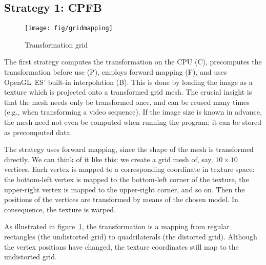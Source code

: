 \documentclass[english,12pt]{ifimaster}
\begin{document}
\subsection{Strategy 1: CPFB}

\begin{figure}[b]
  \centering
  \texttt{[image: fig/gridmapping]}
  \caption{Transformation grid}
  \label{fig:gridmapping}
\end{figure}

The first strategy computes the transformation on the CPU (C),
precomputes the transformation before use (P), employs forward mapping
(F), and uses OpenGL~ES' built-in interpolation (B). This is done by
loading the image as a texture which is projected onto a transformed
grid mesh. The crucial insight is that the mesh needs only be
transformed once, and can be reused many times (e.g., when
transforming a video sequence). If the image size is known in advance,
the mesh need not even be computed when running the program; it can be
stored as precomputed data.



The strategy uses forward mapping, since the shape of the mesh is
transformed directly. We can think of it like this: we create a grid
mesh of, say, $10 \times 10$ vertices. Each vertex is mapped to a
corresponding coordinate in texture space: the bottom-left vertex is
mapped to the bottom-left corner of the texture, the upper-right
vertex is mapped to the upper-right corner, and so on. Then the
positions of the vertices are transformed by means of the chosen
model. In consequence, the texture is warped.

As illustrated in figure~\ref{fig:gridmapping}, the transformation is
a mapping from regular rectangles (the undistorted grid) to
quadrilaterals (the distorted grid). Although the vertex positions
have changed, the texture coordinates still map to the undistorted
grid.
\end{document}
